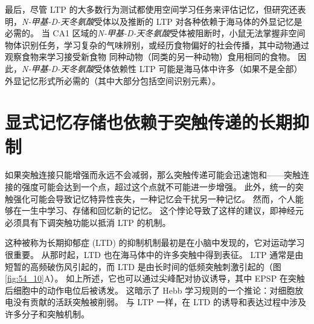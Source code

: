 最后，尽管 LTP 的大多数行为测试都使用空间学习任务来评估记忆，但研究还表明，\textit{N-甲基-D-天冬氨酸}受体以及推断的 LTP 对各种依赖于海马体的外显记忆是必需的。
当 CA1 区域的\textit{N-甲基-D-天冬氨酸}受体被阻断时，小鼠无法掌握非空间物体识别任务，学习复杂的气味辨别，或经历食物偏好的社会传播，其中动物通过观察食物来学习接受新食物 同种动物（同类的另一种动物）食用相同的食物。
因此，\textit{N-甲基-D-天冬氨酸}受体依赖性 LTP 可能是海马体中许多（如果不是全部）外显记忆形式所必需的（其中大部分包括空间识别元素）。



\section{显式记忆存储也依赖于突触传递的长期抑制}

如果突触连接只能增强而永远不会减弱，那么突触传递可能会迅速饱和——突触连接的强度可能会达到一个点，超过这个点就不可能进一步增强。
此外，统一的突触强化可能会导致记忆特异性丧失，一种记忆会干扰另一种记忆。
然而，个人能够在一生中学习、存储和回忆新的记忆。
这个悖论导致了这样的建议，即神经元必须具有下调突触功能以抵消 LTP 的机制。


这种被称为长期抑郁症 (LTD) 的抑制机制最初是在小脑中发现的，它对运动学习很重要。
从那时起，LTD 也在海马体中的许多突触中得到表征。 LTP 通常是由短暂的高频破伤风引起的，而 LTD 是由长时间的低频突触刺激引起的（图 \ref{fig:54_10}A）。
如上所述，它也可以通过尖峰配对协议诱导，其中 EPSP 在突触后细胞中的动作电位后被诱发。
这暗示了 Hebb 学习规则的一个推论：对细胞放电没有贡献的活跃突触被削弱。
与 LTP 一样，在 LTD 的诱导和表达过程中涉及许多分子和突触机制。



